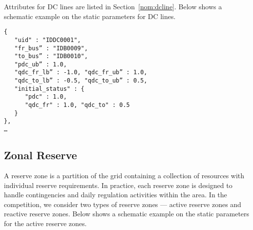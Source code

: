Attributes for DC lines are listed in Section~\ref{nom:dcline}.
Below shows a schematic example on the static parameters for DC lines.
\begin{verbatim}
{
   "uid" : "IDDC0001",
   "fr_bus” : "IDB0009", 
   "to_bus” : "IDB0010",
   "pdc_ub” : 1.0, 
   "qdc_fr_lb” : -1.0, "qdc_fr_ub” : 1.0,
   "qdc_to_lb” : -0.5, "qdc_to_ub” : 0.5,
   "initial_status" : {
      "pdc" : 1.0, 
      "qdc_fr" : 1.0, "qdc_to" : 0.5 
   }
},
…    
\end{verbatim}



\subsection{Zonal Reserve}
\label{sec:reserve}
A reserve zone is a partition of the grid containing a collection of resources with individual reserve requirements.
In practice, each reserve zone is designed to handle contingencies 
and daily regulation activities within the area.
In the competition, we consider two types of reserve zones --- active reserve zones and reactive reserve zones. 
Below shows a schematic example on the static parameters for the active reserve zones. 

